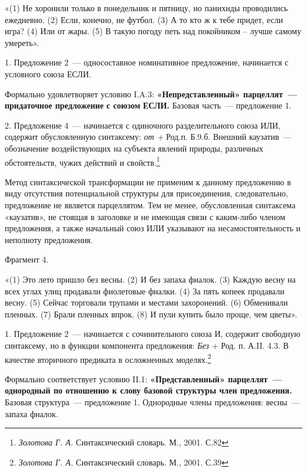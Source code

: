 \documentclass{kursa4}
\begin{document}
{      {«(1) Не хоронили только в понедельник и пятницу, но панихиды проводились ежедневно. (2) Если, конечно, не футбол. (3) А то кто ж к тебе придет, если игра? (4) Или от жары. (5)
      }{В такую погоду петь над покойником – лучше самому умереть».}

      {1. Предложение 2~--- односоставное номинативное предложение, начинается с условного союза ЕСЛИ.}

      {Формально удовлетворяет условию I.A.3:
      }\textbf{{«Непредставленный» парцеллят~--- придаточное предложение }}\textbf{{с союзом
      }}\textbf{{ЕСЛИ}}\textbf{{.
      }}{Базовая часть~--- предложение 1. }

      {2. Предложение 4~--- начинается с одиночного разделительного союза ИЛИ, содержит обусловленную синтаксему:
      }\textit{{от + }}{Род.п. Б.9.б. Внешний каузатив~--- обозначение воздействующих на субъекта явлений природы, различных обстоятельств, чужих действий и свойств.}\footnote{\textit{{ Золотова Г. А. }}{Синтаксический словарь. М., 2001. С.82}}{ }

      {Метод синтаксической трансформации не применим к данному предложению в виду отсутствия потенциальной структуры для присоединения, следовательно, предложение не является парцеллятом. Тем не менее, обусловленная синтаксема «каузатив», не стоящая в заголовке и не имеющая связи с каким-либо членом предложения, а также начальный союз ИЛИ указывают на несамостоятельность и неполноту предложения. }

      {Фрагмент 4.}

      {«(1) Это лето пришло без весны. (2) И без запаха фиалок. (3) Каждую весну на всех углах улиц продавали фиолетовые фиалки. (4) За пять копеек продавали весну. (5) Сейчас торговали трупами и местами захоронений. (6) Обменивали
      }{пленных. (7) Брали пленных впрок. (8) И пули купить было проще, чем цветы».}

      {1. Предложение 2~--- начинается с сочинительного союза И, содержит свободную синтаксему, но в функции компонента предложения: }\textit{{Без }}{+ Род. п.}{ А.II. 4.3. В качестве вторичного предиката в осложненных моделях.}\footnote{{ }\textit{{Золотова Г. А.
      }}{Синтаксический словарь. М., 2001. С.39}}

      {Формально соответствует }{условию
      II.1}{:
      }\textbf{{«Представленный» парцеллят~--- однородный по отношению к слову базовой структуры член предложения.
      }}{Базовая структура~--- предложение 1. Однородные члены предложения: весны~--- запаха фиалок.}

}
\end{document}
